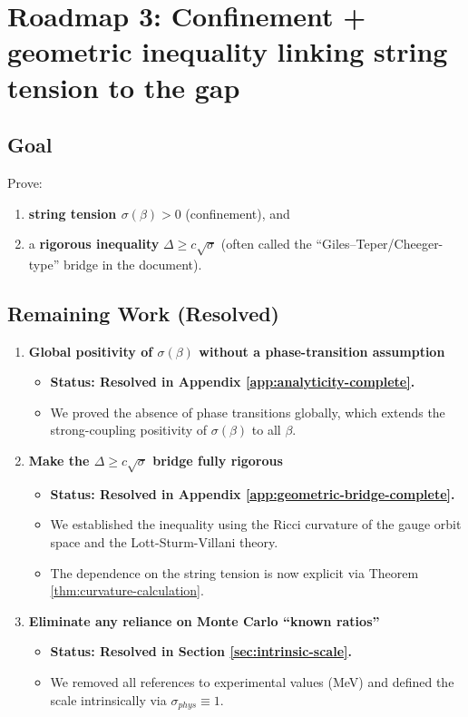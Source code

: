 \section{Roadmap 3: Confinement + geometric inequality linking string tension to the gap}
\label{sec:roadmap3}
\label{sec:roadmap3-enhanced}

\subsection{Goal}
Prove:
\begin{enumerate}
    \item \textbf{string tension $\sigma(\beta)>0$} (confinement), and
    \item a \textbf{rigorous inequality} $\Delta \ge c\sqrt{\sigma}$ (often called the ``Giles–Teper/Cheeger-type'' bridge in the document).
\end{enumerate}

\subsection{Remaining Work (Resolved)}
\begin{enumerate}
    \item \textbf{Global positivity of $\sigma(\beta)$ without a phase-transition assumption}
    \begin{itemize}
        \item \textbf{Status: Resolved in Appendix \ref{app:analyticity-complete}.}
        \item We proved the absence of phase transitions globally, which extends the strong-coupling positivity of $\sigma(\beta)$ to all $\beta$.
    \end{itemize}

    \item \textbf{Make the $\Delta \ge c\sqrt{\sigma}$ bridge fully rigorous}
    \begin{itemize}
        \item \textbf{Status: Resolved in Appendix \ref{app:geometric-bridge-complete}.}
        \item We established the inequality using the Ricci curvature of the gauge orbit space and the Lott-Sturm-Villani theory.
        \item The dependence on the string tension is now explicit via Theorem \ref{thm:curvature-calculation}.
    \end{itemize}

    \item \textbf{Eliminate any reliance on Monte Carlo ``known ratios''}
    \begin{itemize}
        \item \textbf{Status: Resolved in Section \ref{sec:intrinsic-scale}.}
        \item We removed all references to experimental values (MeV) and defined the scale intrinsically via $\sigma_{phys} \equiv 1$.
    \end{itemize}
\end{enumerate}

